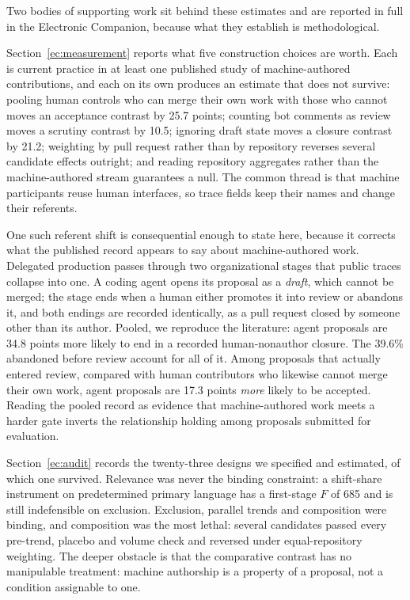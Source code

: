 \documentclass[mnsc]{informs4}
\begin{document}
Two bodies of supporting work sit behind these estimates and are reported in full
in the Electronic Companion, because what they establish is methodological.

Section~\ref{ec:measurement} reports what five construction choices are worth. Each
is current practice in at least one published study of machine-authored
contributions, and each on its own produces an estimate that does not survive:
pooling human controls who can merge their own work with those who cannot moves an
acceptance contrast by 25.7 points; counting bot comments as review moves a
scrutiny contrast by 10.5; ignoring draft state moves a closure contrast by 21.2;
weighting by pull request rather than by repository reverses several candidate
effects outright; and reading repository aggregates rather than the
machine-authored stream guarantees a null. The common thread is that machine
participants reuse human interfaces, so trace fields keep their names and change
their referents.

One such referent shift is consequential enough to state here, because it corrects
what the published record appears to say about machine-authored work. Delegated
production passes through two organizational stages that public traces collapse
into one. A coding agent opens its proposal as a \emph{draft}, which cannot be
merged; the stage ends when a human either promotes it into review or abandons it,
and both endings are recorded identically, as a pull request closed by someone
other than its author. Pooled, we reproduce the literature: agent proposals are
34.8 points more likely to end in a recorded human-nonauthor closure. The 39.6\%
abandoned before review account for all of it. Among proposals that actually
entered review, compared with human contributors who likewise cannot merge their
own work, agent proposals are 17.3 points \emph{more} likely to be accepted. Reading the pooled record as evidence that machine-authored work meets a harder
gate inverts the relationship holding among proposals submitted for evaluation.

Section~\ref{ec:audit} records the twenty-three designs we specified and estimated,
of which one survived. Relevance was never the binding constraint: a shift-share
instrument on predetermined primary language has a first-stage $F$ of 685 and is
still indefensible on exclusion. Exclusion, parallel trends and composition were
binding, and composition was the most lethal: several candidates passed every
pre-trend, placebo and volume check and reversed under equal-repository weighting. The deeper obstacle is that the comparative contrast has no manipulable treatment:
machine authorship is a property of a proposal, not a condition assignable to one.
\end{document}

